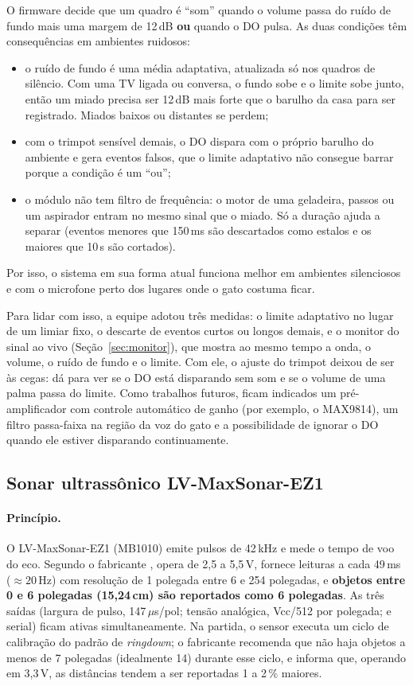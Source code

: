 O firmware decide que um quadro é ``som'' quando o volume passa do ruído de fundo mais uma margem de 12\,dB \textbf{ou} quando o DO pulsa. As duas condições têm consequências em ambientes ruidosos:
\begin{itemize}
  \item o ruído de fundo é uma média adaptativa, atualizada só nos quadros de silêncio. Com uma TV ligada ou conversa, o fundo sobe e o limite sobe junto, então um miado precisa ser 12\,dB mais forte que o barulho da casa para ser registrado. Miados baixos ou distantes se perdem;
  \item com o trimpot sensível demais, o DO dispara com o próprio barulho do ambiente e gera eventos falsos, que o limite adaptativo não consegue barrar porque a condição é um ``ou'';
  \item o módulo não tem filtro de frequência: o motor de uma geladeira, passos ou um aspirador entram no mesmo sinal que o miado. Só a duração ajuda a separar (eventos menores que 150\,ms são descartados como estalos e os maiores que 10\,s são cortados).
\end{itemize}
Por isso, o sistema em sua forma atual funciona melhor em ambientes silenciosos e com o microfone perto dos lugares onde o gato costuma ficar.

Para lidar com isso, a equipe adotou três medidas: o limite adaptativo no lugar de um limiar fixo, o descarte de eventos curtos ou longos demais, e o monitor do sinal ao vivo (Seção~\ref{sec:monitor}), que mostra ao mesmo tempo a onda, o volume, o ruído de fundo e o limite. Com ele, o ajuste do trimpot deixou de ser às cegas: dá para ver se o DO está disparando sem som e se o volume de uma palma passa do limite. Como trabalhos futuros, ficam indicados um pré-amplificador com controle automático de ganho (por exemplo, o MAX9814), um filtro passa-faixa na região da voz do gato e a possibilidade de ignorar o DO quando ele estiver disparando continuamente. 

\subsection{Sonar ultrassônico LV-MaxSonar-EZ1}
\label{sec:sonar}

\paragraph{Princípio.}
O LV-MaxSonar-EZ1 (MB1010) emite pulsos de 42\,kHz e mede o tempo de voo do eco. Segundo o fabricante \citep{maxbotixez1}, opera de 2,5 a 5,5\,V, fornece leituras a cada 49\,ms ($\approx 20$\,Hz) com resolução de 1 polegada entre 6 e 254 polegadas, e \textbf{objetos entre 0 e 6 polegadas (15,24\,cm) são reportados como 6 polegadas}. As três saídas (largura de pulso, 147\,$\mu$s/pol; tensão analógica, Vcc/512 por polegada; e serial) ficam ativas simultaneamente. Na partida, o sensor executa um ciclo de calibração do padrão de \textit{ringdown}; o fabricante recomenda que não haja objetos a menos de 7 polegadas (idealmente 14) durante esse ciclo, e informa que, operando em 3,3\,V, as distâncias tendem a ser reportadas 1 a 2\,\% maiores.

